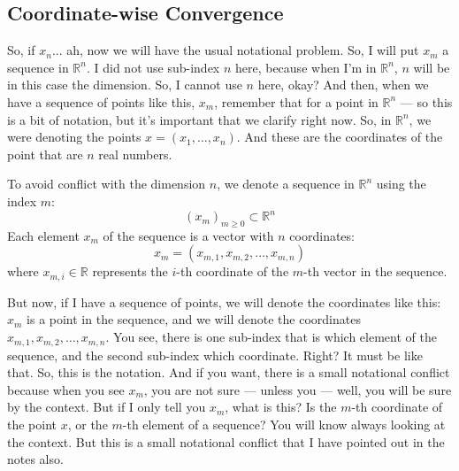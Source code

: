 
\subsection{Coordinate-wise Convergence}

\begin{spoken-clean}[00:12:38 - 00:14:12]
So, if $x_n$... ah, now we will have the usual notational problem. So, I will put $x_m$  a sequence in $\mathbb{R}^n$. I did not use sub-index $n$ here, because when I'm in $\mathbb{R}^n$, $n$ will be in this case the dimension. So, I cannot use $n$ here, okay? And then, when we have a sequence of points like this, $x_m$, remember that for a point in $\mathbb{R}^n$ --- so this is a bit of notation, but it's important that we clarify right now. So, in $\mathbb{R}^n$, we were denoting the points $x = (x_1, \dots, x_n)$. And these are the coordinates of the point that are $n$ real numbers.
\end{spoken-clean}

\begin{math-stroke}
To avoid conflict with the dimension $n$, we denote a sequence in $\mathbb{R}^n$ using the index $m$:
\[ (x_m)_{m \ge 0} \subset \mathbb{R}^n \]
Each element $x_m$ of the sequence is a vector with $n$ coordinates:
\[ x_m = (x_{m,1}, x_{m,2}, \dots, x_{m,n}) \]
where $x_{m,i} \in \mathbb{R}$ represents the $i$-th coordinate of the $m$-th vector in the sequence.
\end{math-stroke}

\begin{spoken-clean}[00:14:12 - 00:15:50]
But now, if I have a sequence of points, we will denote the coordinates like this: $x_m$ is a point in the sequence, and we will denote the coordinates $x_{m,1}, x_{m,2}, \dots, x_{m,n}$.  You see, there is one sub-index that is which element of the sequence, and the second sub-index which coordinate. Right? It must be like that. So, this is the notation. And if you want, there is a small notational conflict because when you see $x_m$, you are not sure --- unless you --- well, you will be sure by the context. But if I only tell you $x_m$, what is this? Is the $m$-th coordinate of the point $x$, or the $m$-th element of a sequence? You will know always looking at the context. But this is a small notational conflict that I have pointed out in the notes also.
\end{spoken-clean}

